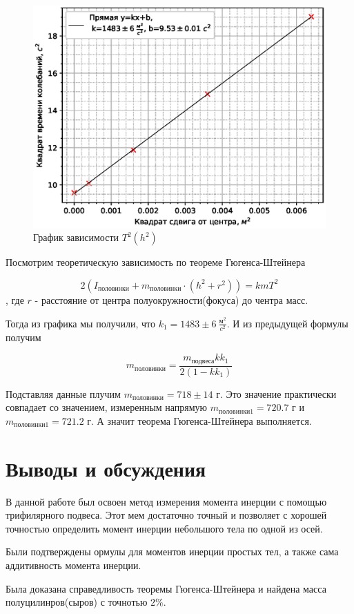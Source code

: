 \documentclass[12pt,a4paper]{article}
\begin{document}
\begin{figure}[!ht]
    \includegraphics[width=\textwidth]{imgs/graph.eps}
    \caption{График зависимости $T^2(h^2)$}
    \label{fig:ust1}
\end{figure}

Посмотрим теоретическую зависимость по теореме Гюгенса-Штейнера

\begin{equation}
    2(I_{половинки}+m_{половинки}\cdot(h^2+r^2))=kmT^2
\end{equation}
, где $r$ - расстояние от центра полуокружности(фокуса) до чентра масс.

Тогда из графика мы получили, что $k_1=1483\pm6~\frac{м^2}{c^2}$.
И из предыдущей формулы получим

\begin{equation}
    m_{половинки}=\frac{m_{подвеса}kk_1}{2(1-kk_1)}
\end{equation}

Подставляя данные плучим $m_{половинки}=718\pm14$ г. Это значение практически совпадает со значением, измеренным напрямую $m_{половинки1}=720.7$ г и $m_{половинки1}=721.2$ г. А значит теорема Гюгенса-Штейнера выполняется.

\section{Выводы и обсуждения}
В данной работе был освоен метод измерения момента инерции с помощью трифилярного подвеса. Этот мем достаточно точный и позволяет с хорошей точностью определить момент инерции небольшого тела по одной из осей.

Были подтверждены ормулы для моментов инерции простых тел, а также сама аддитивность момента инерции.

Была доказана справедливость теоремы Гюгенса-Штейнера и найдена масса полуцилинров(сыров) с точнотью $2\%$.
\end{document}
